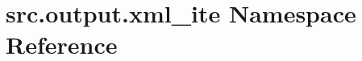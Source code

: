 \hypertarget{namespacesrc_1_1output_1_1xml__ite}{\section{src.\+output.\+xml\+\_\+ite Namespace Reference}
\label{namespacesrc_1_1output_1_1xml__ite}
}
